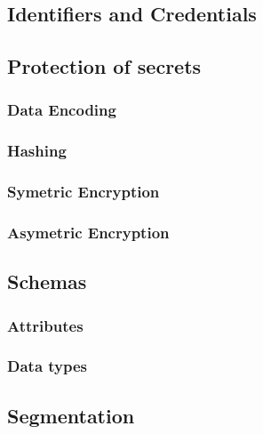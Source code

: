 \hypertarget{identifiers-and-credentials}{%
\subsection{Identifiers and
Credentials}\label{identifiers-and-credentials}}

\hypertarget{protection-of-secrets}{%
\subsection{Protection of secrets}\label{protection-of-secrets}}

\hypertarget{data-encoding}{%
\subsubsection{Data Encoding}\label{data-encoding}}

\hypertarget{hashing}{%
\subsubsection{Hashing}\label{hashing}}

\hypertarget{symetric-encryption}{%
\subsubsection{Symetric Encryption}\label{symetric-encryption}}

\hypertarget{asymetric-encryption}{%
\subsubsection{Asymetric Encryption}\label{asymetric-encryption}}

\hypertarget{schemas}{%
\subsection{Schemas}\label{schemas}}

\hypertarget{attributes}{%
\subsubsection{Attributes}\label{attributes}}

\hypertarget{data-types}{%
\subsubsection{Data types}\label{data-types}}

\hypertarget{segmentation}{%
\subsection{Segmentation}\label{segmentation}}

